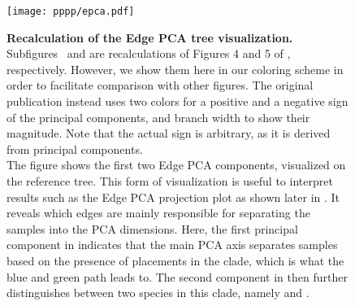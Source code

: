 \begin{figure}[hpbt]
    \centering
    \vspace*{1em}
    \texttt{[image: pppp/epca.pdf]}
    \vspace*{-1em}
    \begin{subfigure}{0pt}
        \label{fig:epca:sub:comp1}
    \end{subfigure}
    \begin{subfigure}{0pt}
        \label{fig:epca:sub:comp2}
    \end{subfigure}
    \caption[Recalculation of the Edge PCA tree visualization]{
        \textbf{Recalculation of the Edge PCA tree visualization.}
        Subfigures~ and  are recalculations
        of Figures 4 and 5 of \cite{Matsen2011a}, respectively.
        However, we show them here in our coloring scheme in order to facilitate comparison with other figures.
        The original publication instead uses two colors for a positive and a negative sign of the principal components,
        and branch width to show their magnitude.
        Note that the actual sign is arbitrary, as it is derived from principal components.
        \\
        The figure shows the first two Edge PCA components, visualized on the reference tree.
        This form of visualization is useful to interpret results such as the Edge PCA projection plot
        as shown later in .
        It reveals which edges are mainly responsible for separating the samples into the PCA dimensions.
        Here, the first principal component in  indicates that the main PCA axis
        separates samples based on the presence of placements in the  clade,
        which is what the blue and green path leads to.
        The second component in  then further distinguishes between two species
        in this clade, namely  and .
    }
    \label{fig:epca}
\end{figure}


